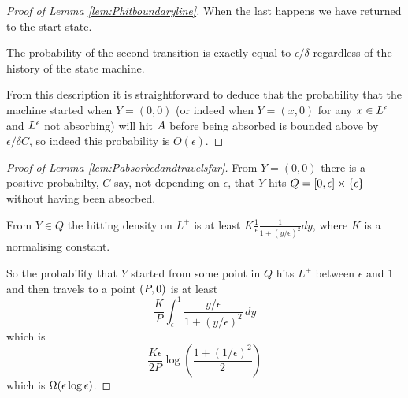 {\begin{proof}[Proof of Lemma \ref{lem:Phitboundaryline}]
When the last happens we have returned to the start state.

The probability of the second transition is exactly equal to
$\epsilon/\delta$ regardless of the history of the state machine.

From this description it is straightforward to deduce that the
probability that the machine started when $Y = (0,0)$ (or indeed when
$Y = (x, 0)$ for any $x \in L^\epsilon$ and $L^\epsilon$ not absorbing) will hit
$A$ before being absorbed is
bounded above by $\epsilon/\delta C$, so indeed this probability is
$O(\epsilon)$.
\end{proof}

\begin{proof}[Proof of Lemma \ref{lem:Pabsorbedandtravelsfar}]
From $Y = (0,0)$ there is a positive probabilty, $C$ say, not
depending on $\epsilon$, that $Y$ hits $Q = [0, \epsilon] \times
\{\epsilon\}$ without having been absorbed.

From $Y \in Q$ the hitting density on $L^+$ is at least $K
\frac{1}{\epsilon} \frac{1}{1 + (y/\epsilon)^2} dy$, where $K$ is a
normalising constant.

So the probability that $Y$ started from some point in $Q$ hits $L^+$
between $\epsilon$ and $1$ and then travels to a point $(P,0)$ is at least
\[
\frac{K}{P} \int_{\epsilon}^{1} \frac{y/\epsilon}{1 + (y/\epsilon)^2}
\, dy
\]
which is
\[
\frac{K\epsilon}{2P} \log\left(\frac{1 + (1/\epsilon)^2}{2}\right)
\]
which is $\Omega(\epsilon\log\epsilon)$.
\end{proof}
}

